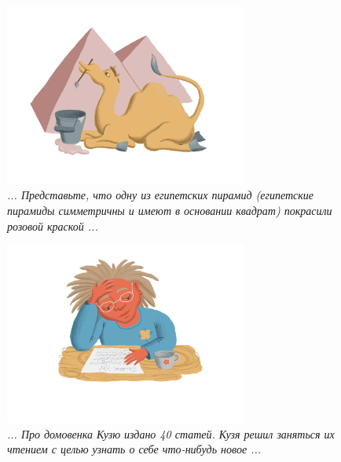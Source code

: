 \documentclass[10pt]{scrbook} \usepackage{modules/nonstahp_book}
\begin{document}
\begin{figure} \begin{center}
	\includegraphics[width=8cm]{figures/color/19}
	\caption{
             {\itshape ... Представьте, что одну из египетских пирамид 
             (египетские пирамиды симметричны и имеют в основании квадрат) 
             покрасили розовой краской ...}\\
             }
\end{center} \end{figure}

\begin{figure} \begin{center}
	\includegraphics[width=8cm]{figures/color/20}
	\caption{
             {\itshape ... Про домовенка Кузю издано 40 статей. 
             Кузя решил заняться их чтением с целью узнать о себе что-нибудь новое ...}\\
             }
\end{center} \end{figure}
\end{document}
